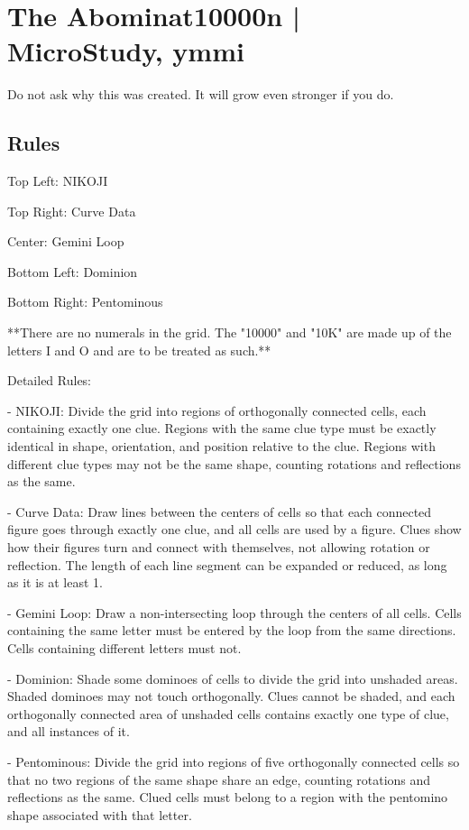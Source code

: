 \section{The Abominat10000n | {\normalfont MicroStudy, ymmi}}
\label{sec:42-the-abominat10000n-microstudy-ymmi}
Do not ask why this was created. It will grow even stronger if you do.
\subsection*{Rules}
\begin{markdown}
Top Left: NIKOJI

Top Right: Curve Data

Center: Gemini Loop

Bottom Left: Dominion

Bottom Right: Pentominous



**There are no numerals in the grid. The "10000" and "10K" are made up of the letters I and O and are to be treated as such.**



Detailed Rules:

- NIKOJI: Divide the grid into regions of orthogonally connected cells, each containing exactly one clue. Regions with the same clue type must be exactly identical in shape, orientation, and position relative to the clue. Regions with different clue types may not be the same shape, counting rotations and reflections as the same.

- Curve Data: Draw lines between the centers of cells so that each connected figure goes through exactly one clue, and all cells are used by a figure. Clues show how their figures turn and connect with themselves, not allowing rotation or reflection. The length of each line segment can be expanded or reduced, as long as it is at least 1.

- Gemini Loop: Draw a non-intersecting loop through the centers of all cells. Cells containing the same letter must be entered by the loop from the same directions. Cells containing different letters must not.

- Dominion: Shade some dominoes of cells to divide the grid into unshaded areas. Shaded dominoes may not touch orthogonally. Clues cannot be shaded, and each orthogonally connected area of unshaded cells contains exactly one type of clue, and all instances of it.

- Pentominous: Divide the grid into regions of five orthogonally connected cells so that no two regions of the same shape share an edge, counting rotations and reflections as the same. Clued cells must belong to a region with the pentomino shape associated with that letter.
\end{markdown}
